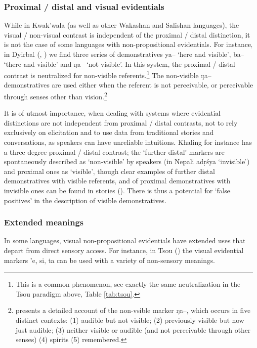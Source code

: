 \documentclass[oneside,a4paper,11pt]{article}
\newcommand{\ipa}[1]{{\phon \mbox{#1}}} %
\begin{document}
 

\subsubsection{Proximal / distal and visual evidentials} \label{sec:proximal}
While in Kwak'wala (as well as other Wakashan and Salishan languages), the visual / non-visual contrast is independent of the proximal / distal distinction, it is not the case of some languages with non-propositional evidentials. For instance, in Dyirbal (\citealt[45]{dixon72dyirbal}, \citealt{dixon14nonvisible}) we find three series of demonstratives \ipa{ya--} `here and visible', \ipa{ba--} `there and visible' and \ipa{ŋa--} `not visible'. In this system, the proximal / distal contrast is neutralized for non-visible referents.\footnote{This is a common phenomenon, see exactly the same neutralization in the Tsou paradigm above, Table \ref{tab:tsou}.} The non-visible \ipa{ŋa--} demonstratives are used either when the referent is not perceivable, or perceivable through senses other than vision.\footnote{\citet{dixon14nonvisible} presents a detailed account of the non-vsible marker  \ipa{ŋa--}, which occurs in five distinct contexts: (1) audible but not visible; (2) previously visible but now just audible; (3) neither visible or audible (and not perceivable through other senses) (4) spirits (5) remembered.  } 

It is of utmost importance, when dealing with systems where evidential distinctions are not independent from proximal / distal contrasts, not to rely exclusively on elicitation and to use data from traditional stories and conversations, as speakers can have unreliable intuitions. Khaling for instance has a three-degree proximal / distal contrast; the `further distal' markers are spontaneously described as `non-visible' by speakers (in Nepali \ipa{adṛśya} `invisible') and proximal ones as `visible', though clear examples of further distal demonstratives with visible referents, and of proximal demonstratives with invisible ones can be found in stories (\citealt[399]{jacques14auditory}). There is thus a potential for `false positives' in the description of visible demonstratives.

\subsubsection{Extended meanings} \label{sec:extended.visible}
In some languages, visual non-propositional evidentials have extended uses that depart from direct sensory access. For instance, in Tsou (\citealt[55-8]{yang00tsou.case}) the visual evidential markers \ipa{'e},  \ipa{si},  \ipa{ta} can be used with a variety of non-sensory meanings. 
\end{document}
